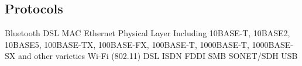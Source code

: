 \subsectionend

\subsection{Protocols}
\label{ssec:protocols}

Bluetooth
DSL
MAC
Ethernet Physical Layer Including 10BASE-T, 10BASE2, 10BASE5, 100BASE-TX, 100BASE-FX, 100BASE-T, 1000BASE-T, 1000BASE-SX and other varieties
Wi-Fi (802.11)
DSL
ISDN
FDDI
SMB
SONET/SDH
USB


\subsectionend



\sectionend

